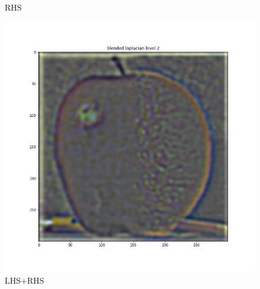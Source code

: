 \documentclass{article}
\begin{document}
\begin{figure}[!htb]
    \caption{RHS}
\endminipage
{}
    \includegraphics[width=\linewidth]{blended laplacian level 2.png}
    \caption{LHS+RHS}
\endminipage
\end{figure}
\end{document}
